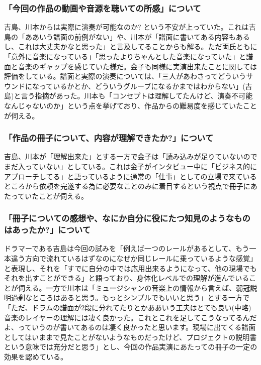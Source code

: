\documentclass[uplatex,dvipdfmx]{ujarticle}
\begin{document}
\subsubsection{「今回の作品の動画や音源を聴いての所感」について}

吉島、川本からは実際に演奏が可能なのか? という不安が上っていた。これは吉島の「ああいう譜面の前例がない」や、川本が「譜面に書いてある内容もあるし、これは大丈夫かなと思った」と言及してることからも解る。ただ両氏ともに「意外に音楽になっている」「思ったよりちゃんとした音楽になっていた」と譜面と音楽のギャップを感じていた様だ。金子も同様に実演出来たことに関しては評価をしている。譜面と実際の演奏については、「三人があわさってどういうサウンドになっているかとか、どういうグルーブになるかまではわからない」(吉島)と言う指摘があった。川本も「コンセプトは理解してたんけど、演奏不可能なんじゃないのか」という点を挙げており、作品からの難易度を感じていたことが伺える。

\subsubsection{「作品の冊子について、内容が理解できたか?」について}

吉島、川本が「理解出来た」とする一方で金子は「読み込みが足りていないのでまだ入っていない」としている。これは金子がインタビュー中に「ビジネス的にアプローチしてる」と語っているように通常の「仕事」としての立場で来ているところから依頼を完遂する為に必要なことのみに着目するという視点で冊子にあたっていたことが伺える。

\subsubsection{「冊子についての感想や、なにか自分に役にたつ知見のようなものはあったか?」について}

ドラマーである吉島は今回の試みを「例えば一つのレールがあるとして、もう一本違う方向で流れているはずなのになぜか同じレールに乗っているような感覚」と表現し、それを「すでに自分の中では応用出来るようになって、他の現場でもそれを出すことができる」と語っており、身体化レベルでの理解が進んでいることが伺える。一方で川本は「ミュージシャンの音楽上の情報から言えば、弱冠説明過剰なところはあると思う。もっとシンプルでもいいと思う」とする一方で「ただ、ドラムの譜面が2段に分れてたりとかああいう工夫はとても良い(中略)音楽のレイヤーの理解には凄く良かった。これとこれを足してこうなってるんだよ、っていうのが書いてあるのは凄く良かったと思います。現場に出てくる譜面としてはいままで見たことがないようなものだったけど、プロジェクトの説明書という意味では充分だと思う」とし、今回の作品実演にあたっての冊子の一定の効果を認めている。
\end{document}

